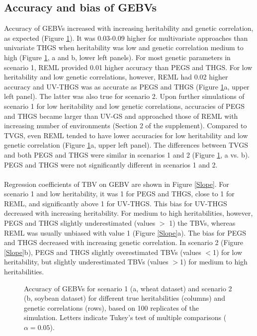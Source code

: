 \documentclass{bmcart}
\def\texttt{[image: ]}
\begin{document}
\subsection{Accuracy and bias of GEBVs}

Accuracy of GEBVs increased with increasing heritability and genetic correlation, as expected (Figure \ref{Accuracy}). It was 0.03-0.09 higher for multivariate approaches than univariate THGS when heritability was low and genetic correlation medium to high (Figure \ref{Accuracy}, a and b, lower left panels). For most genetic parameters in scenario 1, REML provided 0.01 higher accuracy than PEGS and THGS. For low heritability and low genetic correlations, however, REML had 0.02 higher accuracy and UV-THGS was as accurate as PEGS and THGS (Figure \ref{Accuracy}a, upper left panel). The latter was also true for scenario 2. Upon further simulations of scenario 1 for low heritability and low genetic correlations, accuracies of PEGS and THGS became larger than UV-GS and approached those of REML with increasing number of environments (Section 2 of the supplement).
Compared to TVGS, even REML tended to have lower accuracies for low heritability and low genetic correlation (Figure \ref{Accuracy}a, upper left panel). The differences between TVGS and both PEGS and THGS were similar in scenarios 1 and 2 (Figure \ref{Accuracy}, a vs. b). PEGS and THGS were not significantly different in scenarios 1 and 2.
\\\\
Regression coefficients of TBV on GEBV are shown in Figure \ref{Slope}. For scenario 1 and low heritability, it was 1 for PEGS and THGS, close to 1 for REML, and significantly above 1 for UV-THGS. This bias for UV-THGS decreased with increasing heritability. For medium to high heritabilities, however, PEGS and THGS slightly underestimated (values $>$ 1) the TBVs, whereas REML was usually unbiased with value 1 (Figure \ref{Slope}a). The bias for PEGS and THGS decreased with increasing genetic correlation. In scenario 2 (Figure \ref{Slope}b), PEGS and THGS slightly overestimated TBVs (values $<$1) for low heritability, but slightly underestimated TBVs (values $>$1) for medium to high heritabilities. 

\begin{figure}[ht]
  \caption{\small{Accuracy of GEBVs for scenario 1 (a, wheat dataset) and scenario 2 (b, soybean dataset) for different true heritabilities (columns) and genetic correlations (rows), based on 100 replicates of the simulation. Letters indicate Tukey's test of multiple comparisons ($\alpha=0.05$).}}
  \label{Accuracy}
\end{figure}
\end{document}
